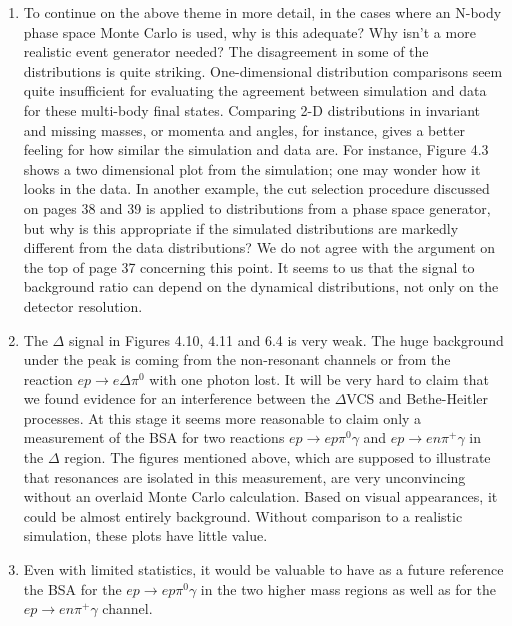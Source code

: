 \documentclass[11pt]{paper}
\begin{document}
\begin{enumerate}
\item To continue on the above theme in more detail, in the cases where an N-body phase space Monte Carlo is used, why is this adequate? Why isn't a more realistic event generator needed? The disagreement in some of the distributions is quite striking. One-dimensional distribution comparisons seem quite insufficient for evaluating the agreement between simulation and data for these multi-body final states. Comparing 2-D distributions in invariant and missing masses, or momenta and angles, for instance, gives a better feeling for how similar the simulation and data are. For instance, Figure 4.3 shows a two dimensional plot from the simulation; one may wonder how it looks in the data. In another example, the cut selection procedure discussed on pages 38 and 39 is applied to distributions from a phase space generator, but why is this appropriate if the simulated distributions are markedly different from the data distributions? We do not agree with the argument on the top of page 37 concerning this point. It seems to us that the signal to background ratio can depend on the dynamical distributions, not only on the detector resolution. 

\item The $\Delta$ signal in Figures 4.10, 4.11 and 6.4 is very weak.  
The huge background under the peak is coming from the non-resonant channels or from the reaction $ep\to e\Delta \pi^0$ with one photon lost. 
It will be very hard to claim that we found evidence for an interference between the $\Delta$VCS and Bethe-Heitler processes.
At this stage it seems more reasonable to claim only a measurement of the BSA for two reactions $ep\to ep\pi^0\gamma$ and $ep\to en\pi^+\gamma$ in the $\Delta$ region. The figures mentioned above, which are supposed to illustrate that resonances are isolated in this measurement, are very unconvincing without an overlaid Monte Carlo calculation. Based on visual appearances, it could be almost entirely background. Without comparison to a realistic simulation, these plots have little value.

\item Even with limited statistics, it would be valuable to have as a future reference the BSA for the $ep\to ep\pi^0\gamma$ in the two higher mass regions as well as for the $ep\to en\pi^+\gamma$ channel.


\end{enumerate}
\end{document}
